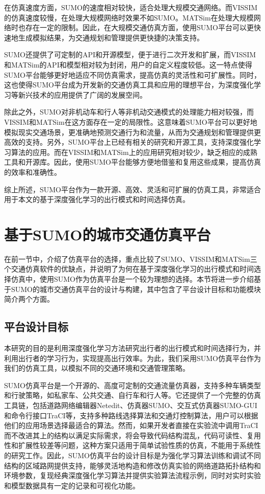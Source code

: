 在仿真速度方面，SUMO的速度相对较快，适合处理大规模交通网络。而VISSIM的仿真速度较慢，在处理大规模网络时效果不如SUMO。MATSim在处理大规模网络时也存在一定的限制。因此，在大规模交通仿真方面，使用SUMO平台可以更快速地生成模拟结果，为交通规划和管理提供更快捷的决策支持。

SUMO还提供了可定制的API和开源模型，便于进行二次开发和扩展，而VISSIM和MATSim的API和模型相对较为封闭，用户的自定义程度较低。这一特点使得SUMO平台能够更好地适应不同仿真需求，提高仿真的灵活性和可扩展性。同时，这也使得SUMO平台成为开发新的交通仿真工具和应用的理想平台，为深度强化学习等新兴技术的应用提供了广阔的发展空间。

除此之外，SUMO对非机动车和行人等非机动交通模式的处理能力相对较强，而VISSIM和MATSim在这方面存在一定的局限性。这意味着SUMO平台可以更好地模拟现实交通场景，更准确地预测交通行为和流量，从而为交通规划和管理提供更高效的支持。另外，SUMO平台上已经有相关的研究和开源工具，支持深度强化学习算法的应用。而在VISSIM和MATSim上的应用研究相对较少，缺乏相应的成熟工具和开源库。因此，使用SUMO平台能够方便地借鉴和复用这些成果，提高仿真的效率和准确性。

综上所述，SUMO平台作为一款开源、高效、灵活和可扩展的仿真工具，非常适合用于本文的基于深度强化学习的出行模式和时间选择仿真。


\section{基于SUMO的城市交通仿真平台}
\label{section:3.2}

在前一节中，介绍了仿真平台的选择，重点比较了SUMO、VISSIM和MATSim三个交通仿真软件的优缺点，并说明了为何在基于深度强化学习的出行模式和时间选择仿真中，使用SUMO作为仿真平台是一个较为理想的选择。本节将进一步介绍基于SUMO的城市交通仿真平台的设计与构建，其中包含了平台设计目标和功能模块简介两个方面。

\subsection{平台设计目标}


本研究的目的是利用深度强化学习方法研究出行者的出行模式和时间选择行为，并利用出行者的学习行为，实现提高出行效率。为此，我们采用SUMO仿真平台作为我们的仿真工具，以模拟不同的交通环境和交通管理策略。

SUMO仿真平台是一个开源的、高度可定制的交通流量仿真器，支持多种车辆类型和行驶策略，如私家车、公共交通、自行车和行人等。它还提供了一个完整的仿真工具链，包括道路网络编辑器Netedit、仿真器SUMO、交互式仿真器SUMO-GUI和命令行接口TraCI等，支持多种路线选择算法和交通灯控制算法，用户可以根据他们的应用场景选择最适合的算法。然而，如果开发者直接在实验流中调用TraCI而不改进其上的结构以满足实际需求，将会导致代码结构混乱，代码可读性、复用性和扩展性较差等问题，这种方案只适用于简单试验性质的仿真，不能用于系统性的研究工作。因此，SUMO仿真平台的设计目标是为强化学习算法训练和调试不同结构的区域路网提供支持，能够灵活地构造和修改仿真实验的网络道路拓扑结构和环境参数，复现经典深度强化学习算法并提供实验算法流程示例，同时对实时实验和模型数据具有一定的记录和可视化功能。
 


